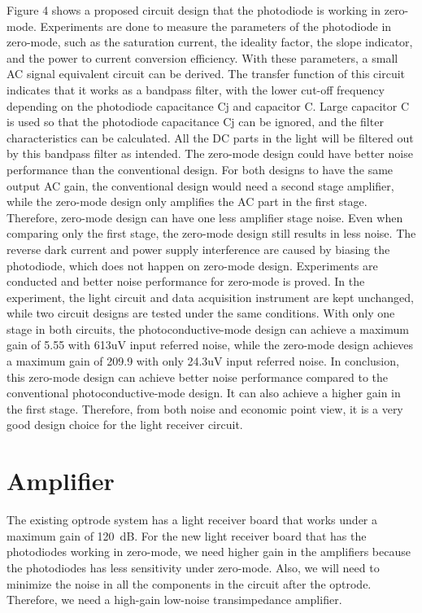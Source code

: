 Figure 4 shows a proposed circuit design that the photodiode is working in zero-mode.  Experiments are done to measure the parameters of the photodiode in zero-mode, such as the saturation current, the ideality factor, the slope indicator, and the power to current conversion efficiency.  With these parameters, a small AC signal equivalent circuit can be derived.  The transfer function of this circuit indicates that it works as a bandpass filter, with the lower cut-off frequency depending on the photodiode capacitance Cj and capacitor C.  Large capacitor C is used so that the photodiode capacitance Cj can be ignored, and the filter characteristics can be calculated.  All the DC parts in the light will be filtered out by this bandpass filter as intended.
The zero-mode design could have better noise performance than the conventional design.  For both designs to have the same output AC gain, the conventional design would need a second stage amplifier, while the zero-mode design only amplifies the AC part in the first stage.  Therefore, zero-mode design can have one less amplifier stage noise.  Even when comparing only the first stage, the zero-mode design still results in less noise.  The reverse dark current and power supply interference are caused by biasing the photodiode, which does not happen on zero-mode design.  Experiments are conducted and better noise performance for zero-mode is proved.
In the experiment, the light circuit and data acquisition instrument are kept unchanged, while two circuit designs are tested under the same conditions.  With only one stage in both circuits, the photoconductive-mode design can achieve a maximum gain of 5.55 with 613uV input referred noise, while the zero-mode design achieves a maximum gain of 209.9 with only 24.3uV input referred noise.
In conclusion, this zero-mode design can achieve better noise performance compared to the conventional photoconductive-mode design.  It can also achieve a higher gain in the first stage.  Therefore, from both noise and economic point view, it is a very good design choice for the light receiver circuit.

\section{Amplifier}

The existing optrode system has a light receiver board that works under a maximum gain of \qty{120}{dB}.  For the new light receiver board that has the photodiodes working in zero-mode, we need higher gain in the amplifiers because the photodiodes has less sensitivity under zero-mode.  Also, we will need to minimize the noise in all the components in the circuit after the optrode.  Therefore, we need a high-gain low-noise transimpedance amplifier.

